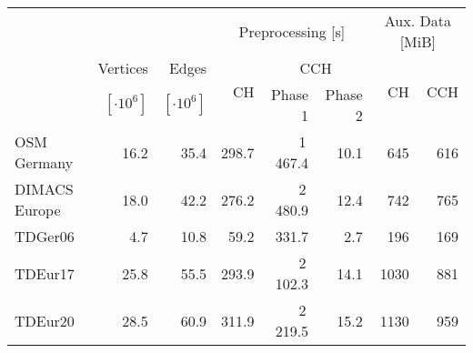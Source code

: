 \begin{tabular}{lrrrrrrr}
\toprule
 &                &                & \multicolumn{3}{c}{Preprocessing [s]} & \multicolumn{2}{c}{Aux. Data [MiB]} \\ \cmidrule(lr){4-6} \cmidrule(lr){7-8}
 & Vertices          & Edges          & \multirow{2}{*}{CH} & \multicolumn{2}{c}{CCH} & \multirow{2}{*}{CH} & \multirow{2}{*}{CCH} \\ \cmidrule(lr){5-6} & $[\cdot 10^6]$ & $[\cdot 10^6]$ &                     & Phase 1 & Phase 2 \\
\midrule
OSM Germany   &       16.2 &       35.4 &                          298.7 &        1\,467.4 &          10.1 &  645 & 616 \\
DIMACS Europe &       18.0 &       42.2 &                          276.2 &        2\,480.9 &          12.4 &  742 & 765 \\
TDGer06       &        4.7 &       10.8 &                           59.2 &           331.7 &           2.7 &  196 & 169 \\
TDEur17       &       25.8 &       55.5 &                          293.9 &        2\,102.3 &          14.1 & 1030 & 881 \\
TDEur20       &       28.5 &       60.9 &                          311.9 &        2\,219.5 &          15.2 & 1130 & 959 \\
\bottomrule
\end{tabular}
